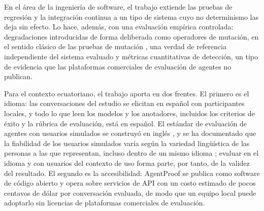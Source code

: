 En el área de la ingeniería de software, el trabajo extiende las pruebas de regresión y la integración continua a un tipo de sistema cuyo no determinismo las deja sin efecto. Lo hace, además, con una evaluación empírica controlada: degradaciones introducidas de forma deliberada como operadores de mutación, en el sentido clásico de las pruebas de mutación \cite{jia2011mutation}, una verdad de referencia independiente del sistema evaluado y métricas cuantitativas de detección, un tipo de evidencia que las plataformas comerciales de evaluación de agentes no publican.
\par\vspace{6pt}
Para el contexto ecuatoriano, el trabajo aporta en dos frentes. El primero es el idioma: las conversaciones del estudio se elicitan en español con participantes locales, y todo lo que leen los modelos y los anotadores, incluidos los criterios de éxito y la rúbrica de evaluación, está en español. El estándar de evaluación de agentes con usuarios simulados se construyó en inglés \cite{yao2024taubench}, y se ha documentado que la fiabilidad de los usuarios simulados varía según la variedad lingüística de las personas a las que representan, incluso dentro de un mismo idioma \cite{seshadri2026lost}; evaluar en el idioma y con usuarios del contexto de uso forma parte, por tanto, de la validez del resultado. El segundo es la accesibilidad: AgentProof se publica como software de código abierto y opera sobre servicios de API con un costo estimado de pocos centavos de dólar por conversación evaluada, de modo que un equipo local puede adoptarlo sin licencias de plataformas comerciales de evaluación.
\par

